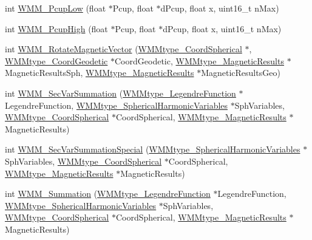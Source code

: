 \begin{DoxyCompactItemize}
\item 
int \hyperlink{group___tau_labs_libraries_ga30ba4a7b9060ea46c8b97a151e1a672e}{\-W\-M\-M\-\_\-\-Pcup\-Low} (float $\ast$\-Pcup, float $\ast$d\-Pcup, float x, uint16\-\_\-t n\-Max)
\item 
int \hyperlink{group___tau_labs_libraries_ga3a649421022e87b47a631a7209a69b03}{\-W\-M\-M\-\_\-\-Pcup\-High} (float $\ast$\-Pcup, float $\ast$d\-Pcup, float x, uint16\-\_\-t n\-Max)
\item 
int \hyperlink{group___tau_labs_libraries_ga7ff64320e8368dafabb8ff6da6154c0c}{\-W\-M\-M\-\_\-\-Rotate\-Magnetic\-Vector} (\hyperlink{struct_w_m_mtype___coord_spherical}{\-W\-M\-Mtype\-\_\-\-Coord\-Spherical} $\ast$, \hyperlink{struct_w_m_mtype___coord_geodetic}{\-W\-M\-Mtype\-\_\-\-Coord\-Geodetic} $\ast$\-Coord\-Geodetic, \hyperlink{struct_w_m_mtype___magnetic_results}{\-W\-M\-Mtype\-\_\-\-Magnetic\-Results} $\ast$\-Magnetic\-Results\-Sph, \hyperlink{struct_w_m_mtype___magnetic_results}{\-W\-M\-Mtype\-\_\-\-Magnetic\-Results} $\ast$\-Magnetic\-Results\-Geo)
\item 
int \hyperlink{group___tau_labs_libraries_gace15597d5b884053e2730413ab894f3e}{\-W\-M\-M\-\_\-\-Sec\-Var\-Summation} (\hyperlink{struct_w_m_mtype___legendre_function}{\-W\-M\-Mtype\-\_\-\-Legendre\-Function} $\ast$\-Legendre\-Function, \hyperlink{struct_w_m_mtype___spherical_harmonic_variables}{\-W\-M\-Mtype\-\_\-\-Spherical\-Harmonic\-Variables} $\ast$\-Sph\-Variables, \hyperlink{struct_w_m_mtype___coord_spherical}{\-W\-M\-Mtype\-\_\-\-Coord\-Spherical} $\ast$\-Coord\-Spherical, \hyperlink{struct_w_m_mtype___magnetic_results}{\-W\-M\-Mtype\-\_\-\-Magnetic\-Results} $\ast$\-Magnetic\-Results)
\item 
int \hyperlink{group___tau_labs_libraries_gaa73c47622a2818fc3db051bd63060211}{\-W\-M\-M\-\_\-\-Sec\-Var\-Summation\-Special} (\hyperlink{struct_w_m_mtype___spherical_harmonic_variables}{\-W\-M\-Mtype\-\_\-\-Spherical\-Harmonic\-Variables} $\ast$\-Sph\-Variables, \hyperlink{struct_w_m_mtype___coord_spherical}{\-W\-M\-Mtype\-\_\-\-Coord\-Spherical} $\ast$\-Coord\-Spherical, \hyperlink{struct_w_m_mtype___magnetic_results}{\-W\-M\-Mtype\-\_\-\-Magnetic\-Results} $\ast$\-Magnetic\-Results)
\item 
int \hyperlink{group___tau_labs_libraries_ga0ee76e9b4bd7c03fd01f84860e7d7dd3}{\-W\-M\-M\-\_\-\-Summation} (\hyperlink{struct_w_m_mtype___legendre_function}{\-W\-M\-Mtype\-\_\-\-Legendre\-Function} $\ast$\-Legendre\-Function, \hyperlink{struct_w_m_mtype___spherical_harmonic_variables}{\-W\-M\-Mtype\-\_\-\-Spherical\-Harmonic\-Variables} $\ast$\-Sph\-Variables, \hyperlink{struct_w_m_mtype___coord_spherical}{\-W\-M\-Mtype\-\_\-\-Coord\-Spherical} $\ast$\-Coord\-Spherical, \hyperlink{struct_w_m_mtype___magnetic_results}{\-W\-M\-Mtype\-\_\-\-Magnetic\-Results} $\ast$\-Magnetic\-Results)

\end{DoxyCompactItemize}
